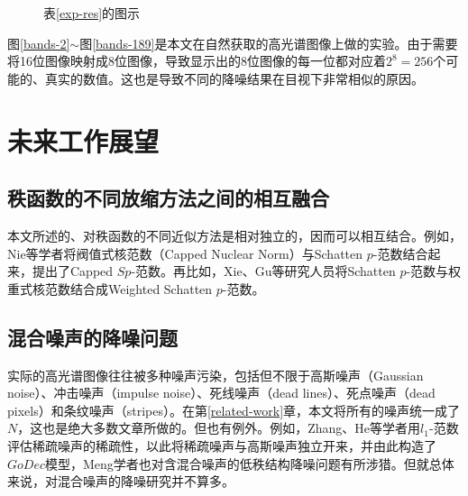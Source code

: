 \documentclass[12pt, a4paper]{article}
\begin{document}
\begin{figure}[H]
\caption{表\ref{exp-res}的图示}
\label{exp-types}
\end{figure}
	
\par 图\ref{bands-2}$\sim$图\ref{bands-189}是本文在自然获取的高光谱图像上做的实验。由于需要将16位图像映射成8位图像，导致显示出的8位图像的每一位都对应着$2^8=256$个可能的、真实的数值。这也是导致不同的降噪结果在目视下非常相似的原因。

\newpage
\section{未来工作展望}
\subsection{秩函数的不同放缩方法之间的相互融合}
\par 本文所述的、对秩函数的不同近似方法是相对独立的，因而可以相互结合。例如，Nie等学者将阀值式核范数（Capped Nuclear Norm）与Schatten $p$-范数结合起来，提出了Capped $Sp$-范数\cite{CNN-2}。再比如，Xie、Gu等研究人员将Schatten $p$-范数与权重式核范数结合成Weighted Schatten $p$-范数\cite{merge-2}。
\subsection{混合噪声的降噪问题}
\par 实际的高光谱图像往往被多种噪声污染，包括但不限于高斯噪声（Gaussian noise）、冲击噪声（impulse noise）、死线噪声（dead lines）、死点噪声（dead pixels）和条纹噪声（stripes）\cite{Mixture}。在第\ref{related-work}章，本文将所有的噪声统一成了$N$，这也是绝大多数文章所做的。但也有例外。例如，Zhang、He等学者用$l_1$-范数评估稀疏噪声的稀疏性，以此将稀疏噪声与高斯噪声独立开来，并由此构造了$GoDec$模型\cite{Mixture}，Meng学者也对含混合噪声的低秩结构降噪问题有所涉猎\cite{meng}。但就总体来说，对混合噪声的降噪研究并不算多。
\end{document}
